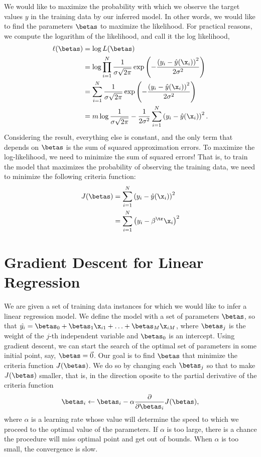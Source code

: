 \begin{refsection}
We would like to maximize the probability with which we observe the target values $y$ in the training data by our inferred model. In other words, we would like to find the parameters $\betas$ to maximize the likelihood. For practical reasons, we compute the logarithm of the likelihood, and call it the log likelihood,
\begin{align}
\ell(\betas) & = \log L(\betas) \\
& = \log \prod_{i=1}^N {1\over\sigma\sqrt{2\pi}} \exp\left({-{\left(y_i-\hat{y}(\x_i)\right)^2\over 2\sigma^2}}\right) \\
& = \sum_{i=1}^N {1\over\sigma\sqrt{2\pi}} \exp\left({-{\left(y_i-\hat{y}(\x_i)\right)^2\over 2\sigma^2}}\right) \\
& = m\log{1\over\sigma\sqrt{2\pi}} - {1\over 2\sigma^2}\sum_{i=1}^N\left(y_i-\hat{y}(\x_i)\right)^2.
\end{align}
Considering the result, everything else is constant, and the only term that depends on $\betas$ is the sum of squared approximation errors. To maximize the log-likelihood, we need to minimize the sum of squared errors! That is, to train the model that maximizes the probability of observing the training data, we need to minimize the following criteria function:
\begin{align}
J(\betas) & =\sum_{i=1}^N\left(y_i-\hat{y}(\x_i)\right)^2 \\
& = \sum_{i=1}^N\left(y_i-\beta^\tr\x_i\right)^2
\end{align}

\section{Gradient Descent for Linear Regression}

We are given a set of training data instances for which we would like to infer a linear regression model. We define the model with a set of parameters $\betas$, so that $\hat{y_i}=\betas_0+\betas_1\x_{i1}+\ldots+\betas_M\x_{iM}$, where $\betas_{j}$ is the weight of the $j$-th independent variable and $\betas_0$ is an intercept. Using gradient descent, we can start the search of the optimal set of parameters in some initial point, say, 
$\betas=\vec{0}$. Our goal is to find $\betas$ that minimize the criteria function $J(\betas)$. We do so by changing each $\betas_j$ so that to make $J(\betas)$ smaller, that is, in the direction oposite to the partial derivative of the criteria function
\begin{equation}
  \betas_i\leftarrow\betas_i-\alpha{\partial\over\partial\betas_i}J(\betas),
\end{equation}
%
where $\alpha$ is a learning rate whose value will determine the speed to which we proceed to the optimal value of the parameters. If $\alpha$ is too large, there is a chance the procedure will miss optimal point and get out of bounds. When $\alpha$ is too small, the convergence is slow.


\end{refsection}
